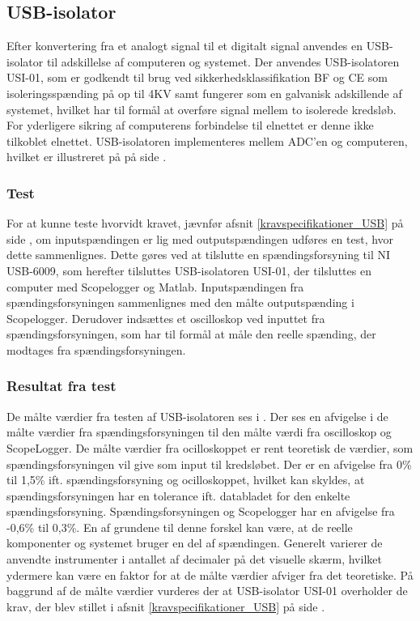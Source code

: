 \subsection{USB-isolator}
Efter konvertering fra et analogt signal til et digitalt signal anvendes en USB-isolator til adskillelse af computeren og systemet. %
Der anvendes USB-isolatoren USI-01, som er godkendt til brug ved sikkerhedsklassifikation BF og CE som isoleringsspænding på op til 4KV samt fungerer som en galvanisk adskillende af systemet, hvilket har til formål at overføre signal mellem to isolerede kredsløb. For yderligere sikring af computerens forbindelse til elnettet er denne ikke tilkoblet elnettet. USB-isolatoren implementeres mellem ADC'en og computeren, hvilket er illustreret på  på side \pageref{kravblok}.

\subsubsection{Test}
For at kunne teste hvorvidt kravet, jævnfør afsnit \ref{kravspecifikationer_USB} på side \pageref{kravspecifikationer_USB}, om inputspændingen er lig med outputspændingen udføres en test, hvor dette sammenlignes. Dette gøres ved at tilslutte en spændingsforsyning til NI USB-6009, som herefter tilsluttes USB-isolatoren USI-01, der tilsluttes en computer med Scopelogger og Matlab. Inputspændingen fra spændingsforsyningen sammenlignes med den målte outputspænding i Scopelogger. Derudover indsættes et oscilloskop ved inputtet fra spændingsforsyningen, som har til formål at måle den reelle spænding, der modtages fra spændingsforsyningen. 

\subsubsection{Resultat fra test}
De målte værdier fra testen af USB-isolatoren ses i . Der ses en afvigelse i de målte værdier fra spændingsforsyningen til den målte værdi fra oscilloskop og ScopeLogger. De målte værdier fra ocilloskoppet er rent teoretisk de værdier, som spændingsforsyningen vil give som input til kredsløbet. Der er en afvigelse fra 0\% til 1,5\% ift. spændingsforsyning og ocilloskoppet, hvilket kan skyldes, at spændingsforsyningen har en tolerance ift. databladet for den enkelte spændingsforsyning. Spændingsforsyningen og Scopelogger har en afvigelse fra -0,6\% til 0,3\%. En af grundene til denne forskel kan være, at de reelle komponenter og systemet bruger en del af spændingen. Generelt varierer de anvendte instrumenter i antallet af decimaler på det visuelle skærm, hvilket ydermere kan være en faktor for at de målte værdier afviger fra det teoretiske. På baggrund af de målte værdier vurderes der at USB-isolator USI-01 overholder de krav, der blev stillet i afsnit \ref{kravspecifikationer_USB} på side \pageref{kravspecifikationer_USB}.

